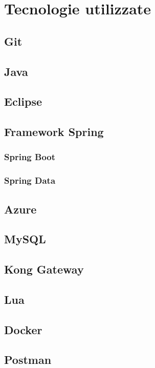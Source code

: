 
\chapter{Tecnologie utilizzate}\label{sec:second_mpi}
\section{Git}
\section{Java}
\section{Eclipse}
\section{Framework Spring}
\subsection{Spring Boot}
\subsection{Spring Data}
\section{Azure}
\section{MySQL}
\section{Kong Gateway}
\section{Lua}
\section{Docker}
\section{Postman}

